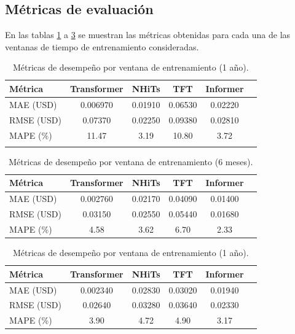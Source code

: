 \documentclass[12pt]{article}
\begin{document}
\bigskip
\subsection{Métricas de evaluación}

En las tablas \ref{metricas_3_meses} a  \ref{metricas_1_anio} se muestran las métricas obtenidas para cada una de las ventanas de tiempo de entrenamiento consideradas.

\begin{table}[H]
\centering
\caption{Métricas de desempeño por ventana de entrenamiento (1 año).}
\begin{tabular}{lccccc}
\toprule
\textbf{Métrica} & \textbf{Transformer} & \textbf{NHiTs} & \textbf{TFT} & \textbf{Informer} \\ 
\midrule
MAE (USD)  & 0.006970 & 0.01910 & 0.06530 & 0.02220 \\
RMSE (USD) & 0.07370 & 0.02250 & 0.09380 & 0.02810 \\
MAPE (\%)  & 11.47 & 3.19 & 10.80 & 3.72 \\
\bottomrule
\label{metricas_3_meses}
\end{tabular}
\end{table}

\begin{table}[H]
\centering
\caption{Métricas de desempeño por ventana de entrenamiento (6 meses).}
\begin{tabular}{lccccc}
\toprule
\textbf{Métrica} & \textbf{Transformer} & \textbf{NHiTs} & \textbf{TFT} & \textbf{Informer} \\ 
\midrule
MAE (USD)  & 0.002760 & 0.02170 & 0.04090 & 0.01400 \\
RMSE (USD) & 0.03150 & 0.02550 & 0.05440 & 0.01680 \\
MAPE (\%)  & 4.58 & 3.62 & 6.70 & 2.33 \\
\bottomrule
\end{tabular}
\label{metricas_6_meses}
\end{table}


\begin{table}[H]
\centering
\caption{Métricas de desempeño por ventana de entrenamiento (1 año).}
\begin{tabular}{lccccc}
\toprule
\textbf{Métrica} & \textbf{Transformer} & \textbf{NHiTs} & \textbf{TFT} & \textbf{Informer} \\ 
\midrule
MAE (USD)  & 0.002340 & 0.02830 & 0.03020 & 0.01940 \\
RMSE (USD) & 0.02640 & 0.03280 & 0.03640 & 0.02330 \\
MAPE (\%)  & 3.90 & 4.72 & 4.90 & 3.17 \\
\bottomrule
\end{tabular}
\label{metricas_1_anio}
\end{table}
\end{document}
